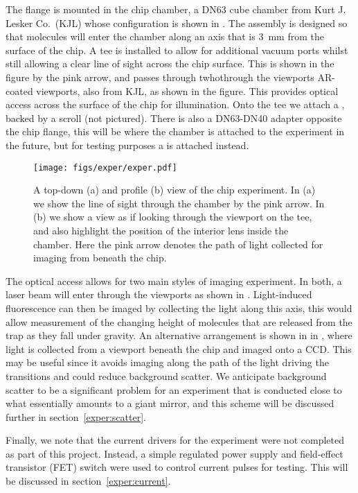 The flange is mounted in the chip chamber, a DN63 cube chamber from Kurt J.
Lesker Co.\ (KJL) whose configuration is shown in .
The assembly is designed so that molecules will enter the chamber along an axis
that is \SI{3}{\milli\meter} from the surface of the chip. A tee is installed
to allow for additional vacuum ports whilst still allowing a clear line of
sight across the chip surface. This is shown in the figure by the pink arrow,
and passes through twhothrough the viewports AR-coated viewports, also from
KJL, as shown in the figure. This provides optical access across the surface of
the chip for illumination.  Onto the tee we attach a , backed by
a scroll (not pictured).  There is also a DN63-DN40 adapter opposite the chip
flange, this will be where the chamber is attached to the \CaF{} experiment in
the future, but for testing purposes a  is attached
instead.

\begin{figure}
  \centering
  \texttt{[image: figs/exper/exper.pdf]}
  \caption{A top-down (a) and profile (b) view of the chip experiment. In (a)
  we show the line of sight through the chamber by the pink arrow. In (b) we
  show a view as if looking through the viewport on the tee, and also highlight
  the position of the interior lens inside the chamber. Here the
  pink arrow denotes the path of light collected for imaging from beneath the
  chip.}
  \label{exper:fig:exper}
\end{figure}

The optical access allows for two main styles of imaging experiment. In both, a
laser beam will enter through the viewports as shown in
. Light-induced fluorescence can then be imaged
by collecting the light along this axis, this would allow measurement of the
changing height of molecules that are released from the trap as they fall under
gravity. 
%
An alternative arrangement is shown in in ,
where light is collected from a viewport beneath the chip and imaged onto a
CCD. This may be useful since it avoids imaging along the path of the light
driving the transitions and could reduce background scatter. We anticipate
background scatter to be a significant problem for an experiment that is
conducted close to what essentially amounts to a giant mirror, and this scheme
will be discussed further in section~\ref{exper:scatter}.

Finally, we note that the current drivers for the experiment were not completed
as part of this project. Instead, a simple regulated power supply and
field-effect transistor (FET) switch were used to control current pulses for
testing. This will be discussed in section~\ref{exper:current}.

